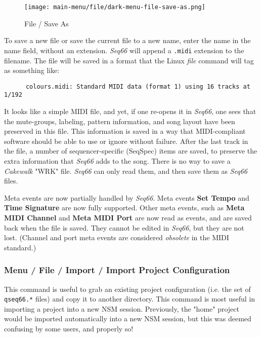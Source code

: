 \begin{figure}[H]
   \centering 
   \texttt{[image: main-menu/file/dark-menu-file-save-as.png]}
   \caption{File / Save As}
   \label{fig:menu_file_save_as}
\end{figure}

   To save a new file or save the current file to a new name,
   enter the name in the name field, without an extension.
   \textsl{Seq66} will append a \texttt{.midi} extension to the filename.
   The file will be saved in a format that the Linux \textsl{file} command
   will tag as something like:

   \begin{verbatim}
      colours.midi: Standard MIDI data (format 1) using 16 tracks at 1/192
   \end{verbatim}

   It looks like a simple MIDI file, and yet, if one re-opens it in
   \textsl{Seq66}, one sees that the mute-groups, labeling, pattern
   information, and song layout have been preserved in this file.
   This information is saved in a way that MIDI-compliant software
   should be able to use or ignore without failure.
   After the last track in the file, a number of
   sequencer-specific (SeqSpec) items are saved, to preserve
   the extra information that \textsl{Seq66} adds to the song.
   There is no way to save a \textsl{Cakewalk} "WRK" file.
   \textsl{Seq66} can only read them, and then save them as
   \textsl{Seq66} files.

   Meta events are now partially handled by \textsl{Seq66}.
   Meta events \textbf{Set Tempo}
   and \textbf{Time Signature}
   are now fully supported.
   Other meta events,
   such as \textbf{Meta MIDI Channel}
   and \textbf{Meta MIDI Port}
   are now read as events, and are saved back when the file is saved.
   They cannot be edited in \textsl{Seq66}, but they are not lost.
   (Channel and port meta events are
   considered \textsl{obsolete} in the MIDI standard.)

\subsubsection{Menu / File / Import / Import Project Configuration}
\label{subsubsec:menu_file_import_project_configuration}

   This command is useful to grab an existing project configuration
   (i.e. the set of \texttt{qseq66.*} files) and copy it
   to another directory.
   This command is most useful in importing a project into a new
   NSM session.  Previously, the "home" project would be imported automatically
   into a new NSM session, but this was deemed confusing by some users, and
   properly so!

